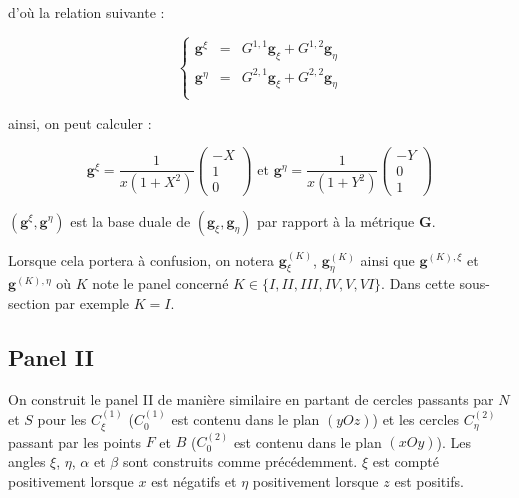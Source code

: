 d'où la relation suivante :

\begin{equation}
\left\lbrace
\begin{array}{rcl}
\mathbf{g}^{\xi} & = & G^{1,1} \mathbf{g}_{\xi} + G^{1,2} \mathbf{g}_{\eta} \\
\mathbf{g}^{\eta} & = & G^{2,1} \mathbf{g}_{\xi} + G^{2,2} \mathbf{g}_{\eta} \\
\end{array}
\right.
\end{equation}

ainsi, on peut calculer :

\begin{equation}
\mathbf{g}^{\xi} = \dfrac{1}{x(1+X^2)}\begin{pmatrix}
-X \\ 1 \\ 0
\end{pmatrix} \text{ et } \mathbf{g}^{\eta} = \dfrac{1}{x(1+Y^2)}\begin{pmatrix}
-Y \\ 0 \\ 1
\end{pmatrix}
\label{eq: base duale I}
\end{equation}

$( \mathbf{g}^{\xi}, \mathbf{g}^{\eta})$ est la base duale de $(\mathbf{g}_{\xi}, \mathbf{g}_{\eta})$ par rapport à la métrique $\mathbf{G}$.

\begin{remarque}
Lorsque cela portera à confusion, on notera $\mathbf{g}_{\xi}^{(K)}$, $\mathbf{g}_{\eta}^{(K)}$ ainsi que $\mathbf{g}^{(K),\xi}$ et $\mathbf{g}^{(K),\eta}$ où $K$ note le panel concerné $K \in \lbrace I, II, III, IV, V, VI \rbrace$. Dans cette sous-section par exemple $K=I$.   
\end{remarque}






\subsection{Panel II}

On construit le panel II de manière similaire en partant de cercles passants par $N$ et $S$ pour les $C_{\xi}^{(1)}$ ($C_{0}^{(1)}$ est contenu dans le plan $(yOz)$) et les cercles $C_{\eta}^{(2)}$ passant par les points $F$ et $B$ ($C_{0}^{(2)}$ est contenu dans le plan $(xOy)$). Les angles $\xi$, $\eta$, $\alpha$ et $\beta$ sont construits comme précédemment.  $\xi$ est compté positivement lorsque $x$ est négatifs et $\eta$ positivement lorsque $z$ est positifs.

